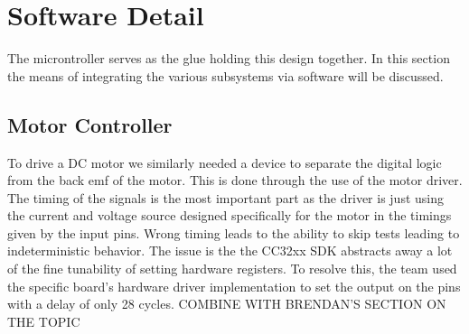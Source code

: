 \documentclass[journal]{IEEEtran}
\begin{document}
\section{Software Detail}
The microntroller serves as the glue holding this design together. In this section the means of
integrating the various subsystems via software will be discussed.
\subsection{Motor Controller}
To drive a DC motor we similarly needed a device to separate the digital logic from the back emf of the motor. This is done through the use of the motor driver. The timing of the signals is the most important part as the driver is just using the current and voltage source designed specifically for the motor in the timings given by the input pins. Wrong timing leads to the ability to skip tests leading to indeterministic behavior. The issue is the the CC32xx SDK abstracts away a lot of the fine tunability of setting hardware registers. To resolve this, the team used the specific board's hardware driver implementation to set the output on the pins with a delay of only 28 cycles. COMBINE WITH BRENDAN'S SECTION ON THE TOPIC
\end{document}
